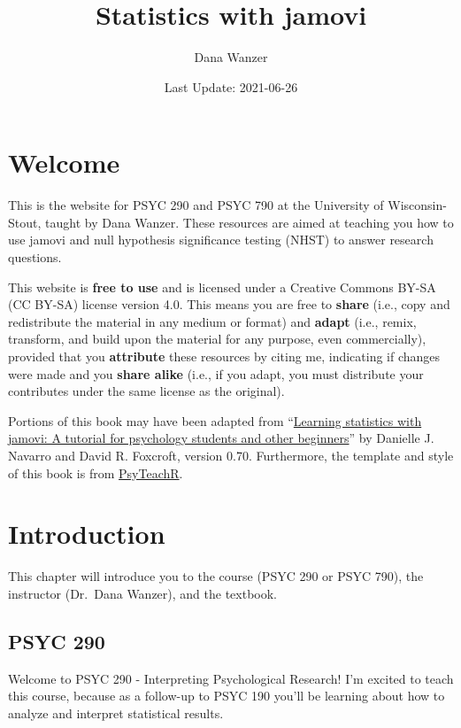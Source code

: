 \documentclass[
]{book}
\title{Statistics with jamovi}
\author{Dana Wanzer}
\date{Last Update: 2021-06-26}
\begin{document}
\maketitle

{
\setcounter{tocdepth}{1}
\tableofcontents
}
\hypertarget{welcome}{%
\chapter*{Welcome}\label{welcome}}

This is the website for PSYC 290 and PSYC 790 at the University of Wisconsin-Stout, taught by Dana Wanzer. These resources are aimed at teaching you how to use jamovi and null hypothesis significance testing (NHST) to answer research questions.

This website is \textbf{free to use} and is licensed under a Creative Commons BY-SA (CC BY-SA) license version 4.0. This means you are free to \textbf{share} (i.e., copy and redistribute the material in any medium or format) and \textbf{adapt} (i.e., remix, transform, and build upon the material for any purpose, even commercially), provided that you \textbf{attribute} these resources by citing me, indicating if changes were made and you \textbf{share alike} (i.e., if you adapt, you must distribute your contributes under the same license as the original).

Portions of this book may have been adapted from ``\href{http://www.learnstatswithjamovi.com}{Learning statistics with jamovi: A tutorial for psychology students and other beginners}'' by Danielle J. Navarro and David R. Foxcroft, version 0.70. Furthermore, the template and style of this book is from \href{https://psyteachr.github.io/book-template/setup.html}{PsyTeachR}.

\hypertarget{introduction}{%
\chapter{Introduction}\label{introduction}}

This chapter will introduce you to the course (PSYC 290 or PSYC 790), the instructor (Dr.~Dana Wanzer), and the textbook.

\hypertarget{psyc-290}{%
\section{PSYC 290}\label{psyc-290}}

Welcome to PSYC 290 - Interpreting Psychological Research! I'm excited to teach this course, because as a follow-up to PSYC 190 you'll be learning about how to analyze and interpret statistical results.
\end{document}
